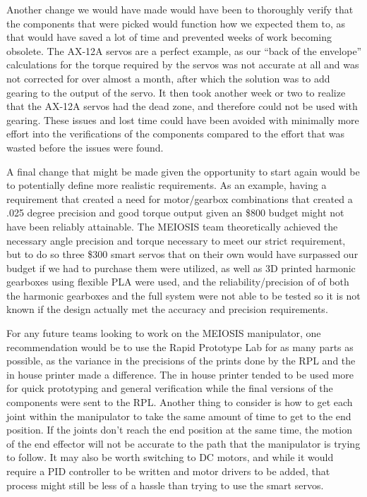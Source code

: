 Another change we would have made would have been to thoroughly verify that the components that were picked would function how we expected them to, as that would have saved a lot of time and prevented weeks of work becoming obsolete. The AX-12A servos are a perfect example, as our “back of the envelope” calculations for the torque required by the servos was not accurate at all and was not corrected for over almost a month, after which the solution was to add gearing to the output of the servo. It then took another week or two to realize that the AX-12A servos had the dead zone, and therefore could not be used with gearing. These issues and lost time could have been avoided with minimally more effort into the verifications of the components compared to the effort that was wasted before the issues were found.

A final change that might be made given the opportunity to start again would be to potentially define more realistic requirements. As an example, having a requirement that created a need for motor/gearbox combinations that created a .025 degree precision and good torque output given an \$800 budget might not have been reliably attainable. The MEIOSIS team theoretically achieved the necessary angle precision and torque necessary to meet our strict requirement, but to do so three \$300 smart servos that on their own would have surpassed our budget if we had to purchase them were utilized, as well as 3D printed harmonic gearboxes using flexible PLA were used, and the reliability/precision of of both the harmonic gearboxes and the full system were not able to be tested so it is not known if the design actually met the accuracy and precision requirements.

For any future teams looking to work on the MEIOSIS manipulator, one recommendation would be to use the Rapid Prototype Lab for as many parts as possible, as the variance in the precisions of the prints done by the RPL and the in house printer made a difference. The in house printer tended to be used more for quick prototyping and general verification while the final versions of the components were sent to the RPL. Another thing to consider is how to get each joint within the manipulator to take the same amount of time to get to the end position. If the joints don’t reach the end position at the same time, the motion of the end effector will not be accurate to the path that the manipulator is trying to follow. It may also be worth switching to DC motors, and while it would require a PID controller to be written and motor drivers to be added, that process might still be less of a hassle than trying to use the smart servos.
